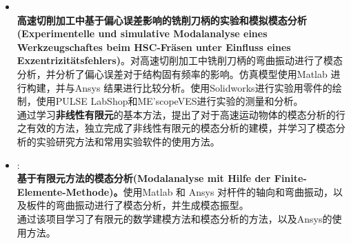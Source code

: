 \documentclass[zh]{resume}
\begin{document}
\begin{itemize}
	\item 
	\\
	\textbf{高速切削加工中基于偏心误差影响的铣削刀柄的实验和模拟模态分析(Experimentelle und simulative Modalanalyse eines Werkzeugs\-chaftes beim HSC-Fräsen unter Einfluss eines Exzentrizitätsfehlers)}。对高速切削加工中铣削刀柄的弯曲振动进行了模态分析，并分析了偏心误差对于结构固有频率的影响。仿真模型使用Matlab 进行构建，并与Ansys 结果进行比较分析。使用Solidworks进行实验用零件的绘制，使用PULSE LabShop和ME'scopeVES进行实验的测量和分析。\\
	通过学习\textbf{非线性有限元}的基本方法，提出了对于高速运动物体的模态分析的行之有效的方法，独立完成了非线性有限元的模态分析的建模，并学习了模态分析的实验研究方法和常用实验软件的使用方法。
	
	\item 
	: %
	\\
    \textbf{基于有限元方法的模态分析(Modalanalyse mit Hilfe der Finite-Elemente-Methode)。}使用Matlab 和 Ansys 对杆件的轴向和弯曲振动，以及板件的弯曲振动进行了模态分析，并生成模态振型。\\
    通过该项目学习了有限元的数学建模方法和模态分析的方法，以及Ansys的使用方法。
	
	
	
	
	
  		
\end{itemize}
\end{document}
